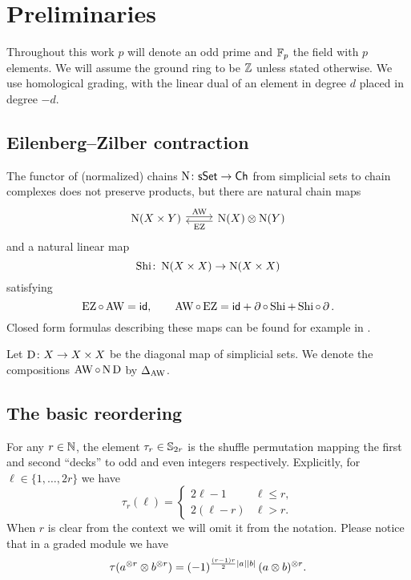 
\section{Preliminaries}\label{s:preliminaries}

Throughout this work $p$ will denote an odd prime and ${\mathbb{F}_p}$ the field with $p$ elements.
We will assume the ground ring to be $\mathbb{Z}$ unless stated otherwise.
We use homological grading, with the linear dual of an element in degree $d$ placed in degree $-d$.

\subsection{Eilenberg--Zilber contraction}

The functor of (normalized) chains $\operatorname{N} \colon \mathsf{sSet} \to \mathsf{Ch}$ from simplicial sets to chain complexes does not preserve products, but there are natural chain maps
\[
\begin{tikzcd}
	\chains(X \times Y) \arrow[r,shift left=2pt,"\AW"] &
	\chains(X) \ot \chains(Y) \arrow[l,shift left=2pt,"\EZ"]
\end{tikzcd}
\]
and a natural linear map
\[
\operatorname{Shi} \colon \operatorname{N}(X \times X) \to \operatorname{N}(X \times X)
\]
satisfying
\[
\operatorname{EZ} \circ \operatorname{AW} = \mathsf{id}, \qquad
\operatorname{AW} \circ \operatorname{EZ} = \mathsf{id} + \operatorname{\partial} \circ \operatorname{Shi} + \operatorname{Shi} \circ \operatorname{\partial}.
\]
Closed form formulas describing these maps can be found for example in \cite[56]{real2000homological}.

Let $\mathrm{D} \colon X \to X \times X$ be the diagonal map of simplicial sets.
We denote the compositions $\operatorname{AW} \circ \operatorname{N}\mathrm{D}$ by $\Delta_{\operatorname{AW}}$.

\subsection{The basic reordering}\label{ss:reordering}

For any $r \in \mathbb{N}$, the element $\tau_r \in \mathbb{S}_{2r}$ is the shuffle permutation mapping the first and second ``decks'' to odd and even integers respectively.
Explicitly, for $\ell \in \{1,\dots,2r\}$ we have
\begin{equation*}
	\tau_r(\ell) =
	\begin{cases}
		2\ell-1 & \ell \leq r, \\
		2(\ell-r) & \ell > r.
	\end{cases}
\end{equation*}
When $r$ is clear from the context we will omit it from the notation.
Please notice that in a graded module we have
\[
\tau(a^{\otimes r} \otimes b^{\otimes r}) =
(-1)^{\frac{(r-1)r}{2}\lvert a\rvert\lvert b\rvert} \, (a \otimes b)^{\otimes r}.
\]